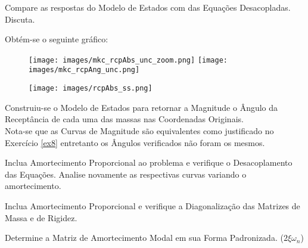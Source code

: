 \documentclass{article}
\begin{document}
\newpage\begin{exercise}\label{ex11}
    Compare as respostas do Modelo de Estados com das Equações Desacopladas. Discuta.
\end{exercise}
\begin{resolution}
    Obtém-se o seguinte gráfico:
    \begin{figure}[H]
        \centering
        \texttt{[image: images/mkc\_rcpAbs\_unc\_zoom.png]}
        \texttt{[image: images/mkc\_rcpAng\_unc.png]}
    \end{figure}
    \begin{figure}[H]
        \centering
        \texttt{[image: images/rcpAbs\_ss.png]}
    \end{figure}
    Construiu-se o Modelo de Estados para retornar a Magnitude o Ângulo da Receptância de cada uma das massas nas Coordenadas Originais.\\
    
    Nota-se que as Curvas de Magnitude são equivalentes como justificado no Exercício \ref{ex8} entretanto os Ângulos verificados não foram os mesmos.
\end{resolution}


\newpage\begin{exercise}\label{ex12}
    Inclua Amortecimento Proporcional ao problema e verifique o Desacoplamento das Equações. Analise novamente as respectivas curvas variando o amortecimento.
\end{exercise}
\begin{resolution}
    
\end{resolution}


\newpage\begin{exercise}\label{ex13}
    Inclua Amortecimento Proporcional e verifique a Diagonalização das Matrizes de Massa e de Rigidez.
\end{exercise}
\begin{resolution}
    
\end{resolution}


\newpage\begin{exercise}\label{ex14}
    Determine a Matriz de Amortecimento Modal em sua Forma Padronizada. ($2\xi\omega_n$)
\end{exercise}
\begin{resolution}
    
\end{resolution}
\end{document}
